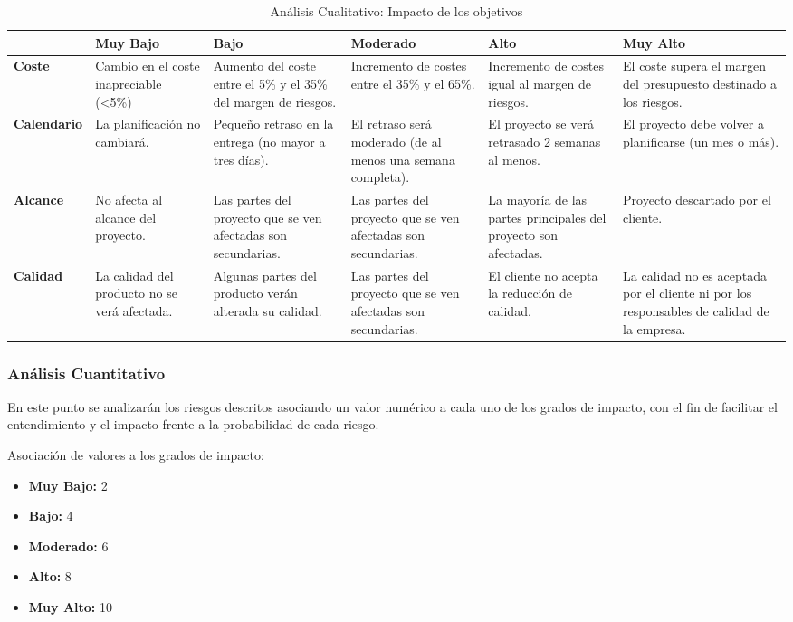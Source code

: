 \begin{table}[H]
\begin{center}
\begin{tabular}{p{2cm}|p{2.5cm} p{2.5cm} p{2.5cm} p{2.5cm} p{2.5cm} }
  & \textbf{Muy Bajo} & \textbf{Bajo} & \textbf{Moderado} & \textbf{Alto} & \textbf{Muy Alto}\\
\hline \hline
\textbf{Coste} & Cambio en el coste inapreciable (<5\%) & Aumento del coste entre el 5\% y el 35\% del margen de riesgos.& Incremento de costes entre el 35\% y el 65\%.& Incremento de costes igual al margen de riesgos.&El coste supera el margen del presupuesto destinado a los riesgos. \\
\hline
\textbf{Calendario} & La planificación no cambiará.& Pequeño retraso en la entrega (no mayor a tres días).&El retraso será moderado (de al menos una semana completa). & El proyecto se verá retrasado 2 semanas al menos.& El proyecto debe volver a planificarse (un mes o más).\\
\hline
\textbf{Alcance} & No afecta al alcance del proyecto.& Las partes del proyecto que se ven afectadas son secundarias.& Las partes del proyecto que se ven afectadas son secundarias.&La mayoría de las partes principales del proyecto son afectadas. & Proyecto descartado por el cliente.\\
\hline
\textbf{Calidad} & La calidad del producto no se verá afectada.& Algunas partes del producto verán alterada su calidad.& Las partes del proyecto que se ven afectadas son secundarias.& El cliente no acepta la reducción de calidad.& La calidad no es aceptada por el cliente ni por los responsables de calidad de  la empresa. \\
\hline
\end{tabular}
\caption{Análisis Cualitativo: Impacto de los objetivos}
\label{tab:analisis-cualitativo}
\end{center}
\end{table}


\subsubsection{Análisis Cuantitativo}
\par En este punto se analizarán los riesgos descritos asociando un valor numérico a cada uno de los grados de impacto, con el fin de facilitar el entendimiento y el impacto frente a la probabilidad de cada riesgo.
\par Asociación de valores a los grados de impacto:
\begin{itemize}[-]
  \item \textbf{Muy Bajo:} 2
  \item \textbf{Bajo:} 4
  \item \textbf{Moderado:} 6
  \item \textbf{Alto:} 8
  \item \textbf{Muy Alto:} 10
\end{itemize}


